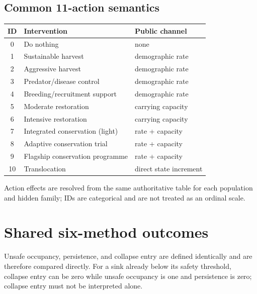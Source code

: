 \documentclass[10pt]{article}
\begin{document}
\subsection{Common 11-action semantics}
\begin{center}\small
\begin{tabular}{@{}cll@{}}
\toprule
ID & Intervention & Public channel\\
\midrule
0 & Do nothing & none\\
1 & Sustainable harvest & demographic rate\\
2 & Aggressive harvest & demographic rate\\
3 & Predator/disease control & demographic rate\\
4 & Breeding/recruitment support & demographic rate\\
5 & Moderate restoration & carrying capacity\\
6 & Intensive restoration & carrying capacity\\
7 & Integrated conservation (light) & rate + capacity\\
8 & Adaptive conservation trial & rate + capacity\\
9 & Flagship conservation programme & rate + capacity\\
10 & Translocation & direct state increment\\
\bottomrule
\end{tabular}
\end{center}
Action effects are resolved from the same authoritative table for each population
and hidden family; IDs are categorical and are not treated as an ordinal scale.

\section{Shared six-method outcomes}
Unsafe occupancy, persistence, and collapse entry are defined identically and are
therefore compared directly.  For a sink already below its safety threshold,
collapse entry can be zero while unsafe occupancy is one and persistence is zero;
collapse entry must not be interpreted alone.
\end{document}
